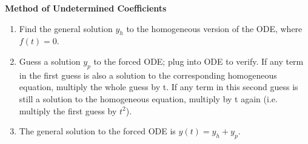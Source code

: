 \documentclass[8pt,letterpaper,boxed]{hmcpset}
\begin{document}
\textbf{Method of Undetermined Coefficients}
\begin{enumerate}
    \item Find the general solution $y_h$ to the homogeneous version of the ODE, where $f(t) = 0$.
    \item Guess a solution $y_p$ to the forced ODE; plug into ODE to verify.
If any term in the first guess is also a solution to the corresponding homogeneous equation, multiply the whole guess by t. If any term in this second guess is still a solution to the homogeneous equation, multiply by t again (i.e. multiply the first guess by $t^2$).
    \item The general solution to the forced ODE is $y(t) = y_h + y_p$.
\end{enumerate}
\end{document}

